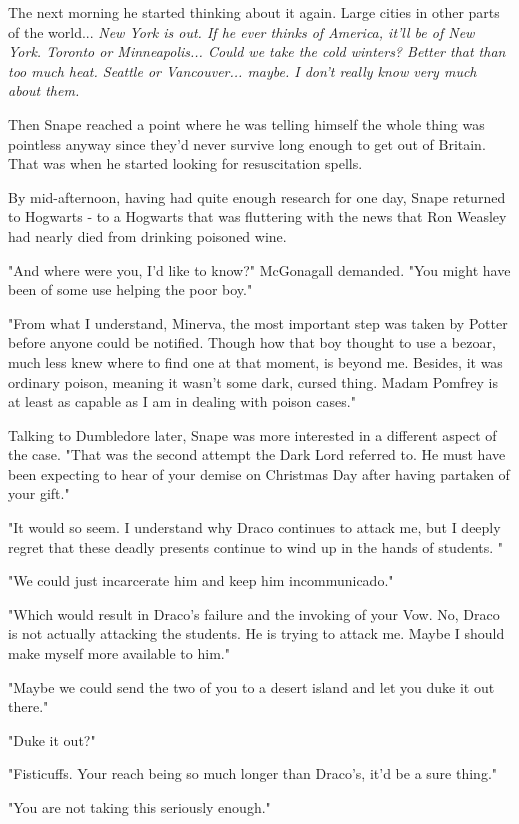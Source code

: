 The next morning he started thinking about it again. Large cities in other parts of the world... \emph{New York is out. If he ever thinks of America, it'll be of New York. Toronto or Minneapolis... Could we take the cold winters? Better that than too much heat. Seattle or Vancouver... maybe. I don't really know very much about them.}

Then Snape reached a point where he was telling himself the whole thing was pointless anyway since they'd never survive long enough to get out of Britain. That was when he started looking for resuscitation spells.

By mid-afternoon, having had quite enough research for one day, Snape returned to Hogwarts - to a Hogwarts that was fluttering with the news that Ron Weasley had nearly died from drinking poisoned wine.

"And where were you, I'd like to know?" McGonagall demanded. "You might have been of some use helping the poor boy."

"From what I understand, Minerva, the most important step was taken by Potter before anyone could be notified. Though how that boy thought to use a bezoar, much less knew where to find one at that moment, is beyond me. Besides, it was ordinary poison, meaning it wasn't some dark, cursed thing. Madam Pomfrey is at least as capable as I am in dealing with poison cases."

Talking to Dumbledore later, Snape was more interested in a different aspect of the case. "That was the second attempt the Dark Lord referred to. He must have been expecting to hear of your demise on Christmas Day after having partaken of your gift."

"It would so seem. I understand why Draco continues to attack me, but I deeply regret that these deadly presents continue to wind up in the hands of students. "

"We could just incarcerate him and keep him incommunicado."

"Which would result in Draco's failure and the invoking of your Vow. No, Draco is not actually attacking the students. He is trying to attack me. Maybe I should make myself more available to him."

"Maybe we could send the two of you to a desert island and let you duke it out there."

"Duke it out?"

"Fisticuffs. Your reach being so much longer than Draco's, it'd be a sure thing."

"You are not taking this seriously enough."

